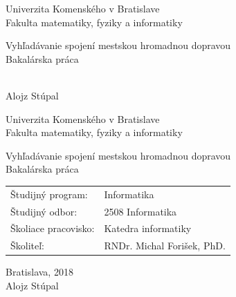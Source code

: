 \documentclass[12pt, oneside]{book}
\def\mfrok{2018}
\def\mfnazov{Vyhľadávanie spojení mestskou hromadnou dopravou}
\def\mftyp{Bakalárska práca}
\def\mfautor{Alojz Stúpal}
\def\mfskolitel{RNDr. Michal Forišek, PhD.}
\def\mfmiesto{Bratislava, \mfrok}
\def\mfodbor{2508 Informatika}
\def\program{ Informatika }
\def\mfpracovisko{ Katedra informatiky }
\begin{document}
     
\frontmatter


\thispagestyle{empty}

\begin{center}
\sc\large
Univerzita Komenského v Bratislave\\
Fakulta matematiky, fyziky a informatiky

\vfill

{\LARGE\mfnazov}\\
\mftyp
\end{center}

\vfill

{\sc\large 
\noindent \mfrok\\
\mfautor
}

\eject %


\thispagestyle{empty}
\noindent

\begin{center}
\sc  
\large
Univerzita Komenského v Bratislave\\
Fakulta matematiky, fyziky a informatiky

\vfill

{\LARGE\mfnazov}\\
\mftyp
\end{center}

\vfill

\noindent
\begin{tabular}{ll}
Študijný program: & \program \\
Študijný odbor: & \mfodbor \\
Školiace pracovisko: & \mfpracovisko \\
Školiteľ: & \mfskolitel \\
\end{tabular}

\vfill


\noindent \mfmiesto\\
\mfautor

\eject %




\end{document}
